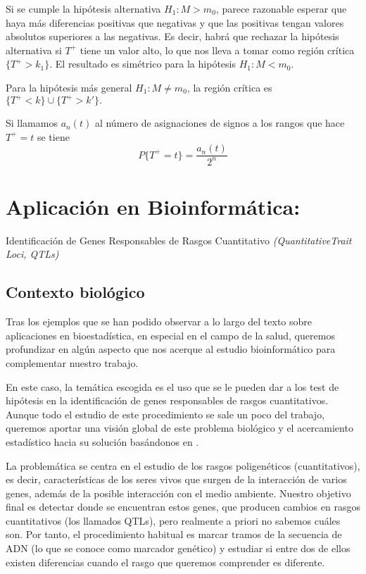 \documentclass[a4paper,12pt]{article}
\begin{document}
Si se cumple la hipótesis alternativa $H_1:M>m_0$, parece razonable esperar que haya más diferencias positivas que negativas y que las positivas tengan valores absolutos superiores a las negativas. Es decir, habrá que rechazar la hipótesis alternativa si $T^+$ tiene un valor alto, lo que nos lleva a tomar como región crítica $\{T^+ > k_1\}$. El resultado es simétrico para la hipótesis $H_1:M<m_0$.

Para la hipótesis más general $H_1: M \neq m_0$, la región crítica es $\{ T^+<k\}\cup\{T^+ >k'\}.$

Si llamamos $a_n(t)$ al número de asignaciones de signos a los rangos que hace $T^+=t$ se tiene $$P\{T^+ = t\}=\frac{a_n(t)}{2^n}$$ 





\section{Aplicación en Bioinformática:}
\large{Identificación de Genes Responsables de Rasgos Cuantitativo \textit{(QuantitativeTrait Loci, QTLs)}}
\normalsize{}
\subsection{Contexto biológico}
Tras los ejemplos que se han podido observar a lo largo del texto sobre aplicaciones en bioestadística, en especial en el campo de la salud, queremos profundizar en algún aspecto que nos acerque al estudio bioinformático para complementar nuestro trabajo.

En este caso, la temática escogida es el uso que se le pueden dar a los test de hipótesis en la identificación de genes responsables de rasgos cuantitativos. Aunque todo el estudio de este procedimiento se sale un poco del trabajo, queremos aportar una visión global de este problema biológico y el acercamiento estadístico hacia su solución basándonos en \cite{uned2}.

La problemática se centra en el estudio de los rasgos poligenéticos (cuantitativos), es decir, características de los seres vivos que surgen de la interacción de varios genes, además de la posible interacción con el medio ambiente. 
Nuestro objetivo final es detectar donde se encuentran estos genes, que producen cambios en rasgos cuantitativos (los llamados QTLs), pero realmente a priori no sabemos cuáles son. Por tanto, el procedimiento habitual es marcar tramos de la secuencia de ADN (lo que se conoce como marcador genético) y estudiar si entre dos de ellos existen diferencias cuando el rasgo que queremos comprender es diferente. 
\end{document}
